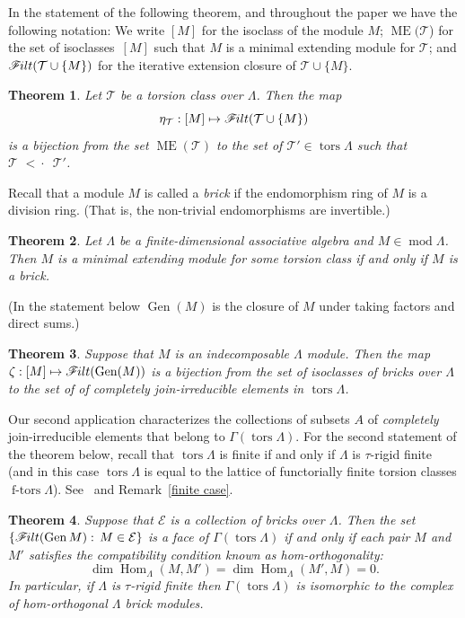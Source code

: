 \documentclass[10pt]{amsart}
\providecommand{\1}{}
\DeclareMathOperator{\tors}{tors}
\DeclareMathOperator{\Hom}{Hom}
\DeclareMathOperator{\ME}{ME}%
\DeclareMathOperator{\module}{mod}
\newcommand{\calE}{\mathcal{E}}
\newcommand{\calT}{\mathcal{T}}
\newcommand{\filt}{\mathscr{F}\Mk ilt}
\newcommand{\covered}{{\,\,<\!\!\!\!\cdot\,\,\,}}
\newcommand{\Gen}{\operatorname{Gen}}
\newcommand{\ftors}{\operatorname{f-tors}}
\renewcommand{\1}{\hat{1}}
\newcommand{\0}{\hat{0}}
\newcommand{\newword}[1]{\emph{#1}}
\newcommand*{\Mk}{\mkern -2mu}
\newtheorem{theorem}{Theorem}[section]
\theoremstyle{definition}
\begin{document}
In the statement of the following theorem, and throughout the paper we have the following notation:
We write $[M]$ for the isoclass of the module $M$; $\ME(\calT$) for the set of isoclasses~$[M]$ such that $M$ is a minimal extending module for $\calT$; and $\filt(\calT \cup \{M\})$ for the iterative extension closure of $\calT \cup \{M\}$.

\begin{theorem}\label{main: covers}
Let $\calT$ be a torsion class over $\Lambda$.
Then the map $$\eta_\calT: [M]\mapsto \filt(\calT\cup \{M\})$$ is a bijection from the set $\ME(\calT)$ to the set of $\calT' \in \tors \Lambda$ such that $\calT \covered \calT'$.
\end{theorem}

Recall that a module $M$ is called a \newword{brick} if the
endomorphism ring of $M$ is a division ring. (That is, the non-trivial
endomorphisms are invertible.)

\begin{theorem}\label{main: cor schur}
Let $\Lambda$ be a finite-dimensional associative algebra and $M\in\module\Lambda$.
Then $M$ is a minimal extending module for some torsion class if and
only if $M$ is a brick.
\end{theorem}
(In the statement below $\Gen(M)$ is the closure of $M$ under taking factors and direct sums.)

\begin{theorem}\label{schur modules to join-irreducibles}
Suppose that $M$ is an indecomposable $\Lambda$ module.
Then the map $\zeta:[M]\mapsto \filt(\Gen(M))$ is a bijection from the
set of isoclasses of bricks over $\Lambda$ to the set of of completely join-irreducible elements in $\tors \Lambda$.
\end{theorem}
Our second application characterizes the collections of subsets $A$ of \emph{completely} join-irreducible elements that belong to $\Gamma(\tors \Lambda)$.
For the second statement of the theorem below, recall that $\tors \Lambda$ is finite if and only if $\Lambda$ is $\tau$-rigid finite (and in this case $\tors \Lambda$ is equal to the lattice of functorially finite torsion classes $\ftors \Lambda$).
See~\cite{IRTT} and Remark~\ref{finite case}.
\setcounter{theorem}{7}
\begin{theorem}\label{main: cjr}
Suppose that $\calE$ is a collection of bricks over $\Lambda$.
Then the set $\{\filt(\Gen M):\, M\in \calE\}$ is a face of $\Gamma(\tors \Lambda)$ if and only if each pair $M$ and $M'$ satisfies the compatibility condition known as \newword{hom-orthogonality}:
\[
\dim \Hom_{\Lambda}(M, M') = \dim \Hom_{\Lambda}(M', M) =0.
\]
In particular, if $\Lambda$ is $\tau$-rigid finite then $\Gamma(\tors \Lambda)$ is isomorphic to the complex of hom-orthogonal $\Lambda$ brick modules.
\end{theorem}
\end{document}
